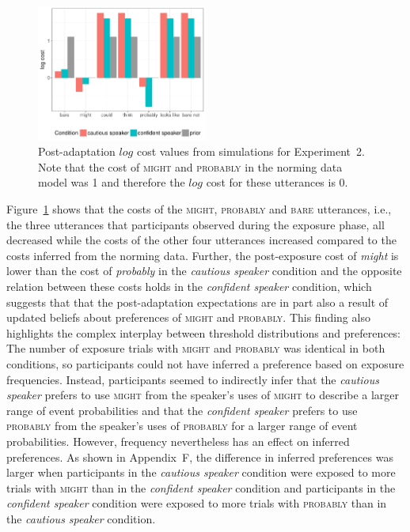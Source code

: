 \begin{figure}
\center
  \includegraphics[width=0.5\textwidth]{plots/fig-12-adaptation-posterior-costs-replication.pdf}
  \caption{Post-adaptation $log$ cost values from simulations for Experiment~2. Note that the cost of \textsc{might} and \textsc{probably} 
  in the norming data model was 1 and therefore the $log$ cost for these utterances is 0. \label{fig:post-exposure-costs}}
\end{figure}

Figure~\ref{fig:post-exposure-costs} shows that the costs of the \textsc{might}, \textsc{probably} and
\textsc{bare} utterances, i.e., the three utterances that participants observed during the exposure phase,
all decreased while the costs of the other four utterances increased compared to the costs inferred from the norming
data. Further, the post-exposure cost of \textit{might} is lower than the cost of \textit{probably} in the \textit{cautious speaker} condition
and the opposite relation between these costs holds in the \textit{confident speaker} condition, which suggests that
that the post-adaptation expectations are in part also a result of updated beliefs about preferences of \textsc{might} and \textsc{probably}. 
This finding also highlights the complex interplay between threshold distributions and preferences: The number of exposure trials 
with \textsc{might} and \textsc{probably} was identical in both conditions, so participants could not have inferred a preference
based on exposure frequencies. Instead, participants seemed to indirectly infer that the \textit{cautious speaker} prefers to use \textsc{might} from the speaker's uses of \textsc{might} to describe a
larger range of event probabilities and that the \textit{confident speaker} prefers to use \textsc{probably} from the speaker's uses of \textsc{probably} for a
larger range of event probabilities. However, frequency nevertheless has an effect on inferred preferences. As shown in Appendix~F, the difference in inferred preferences 
was larger when participants in the \textit{cautious speaker} condition were exposed to more trials with \textsc{might} than in the \textit{confident speaker} condition and participants in the \textit{confident speaker} condition were exposed to more trials with \textsc{probably} than in the \textit{cautious speaker} condition.

